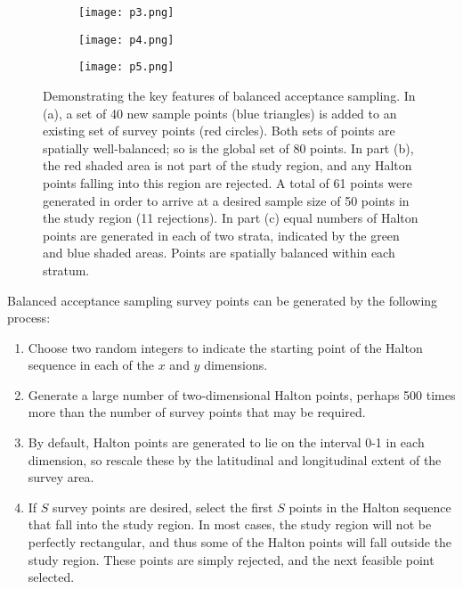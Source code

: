 \documentclass[a4paper,11pt, draft]{article} %
\begin{document}
\begin{figure}[htbp]
\centering
  \begin{subfigure}[b]{0.3\textwidth}
    \texttt{[image: p3.png]}
    \caption{}
  \end{subfigure}
  \begin{subfigure}[b]{0.3\textwidth}
    \texttt{[image: p4.png]}
    \caption{}
  \end{subfigure}
  \begin{subfigure}[b]{0.3\textwidth}
    \texttt{[image: p5.png]}
    \caption{}
  \end{subfigure}
  \caption{Demonstrating the key features of balanced acceptance sampling. In (a), a set of 40 new sample points (blue triangles) is added to an existing set of survey points (red circles). Both sets of points are spatially well-balanced; so is the global set of 80 points. In part (b), the red shaded area is not part of the study region, and any Halton points falling into this region are rejected. A total of 61 points were generated in order to arrive at a desired sample size of 50 points in the study region (11 rejections). In part (c) equal numbers of Halton points are generated in each of two strata, indicated by the green and blue shaded areas. Points are spatially balanced within each stratum.}
  \label{h345}
\end{figure}

Balanced acceptance sampling survey points can be generated by the following process:
\begin{enumerate}
\item Choose two random integers to indicate the starting point of the Halton sequence in each of the $x$ and $y$ dimensions.
\item Generate a large number of two-dimensional Halton points, perhaps 500 times more than the number of survey points that may be required.
\item By default, Halton points are generated to lie on the interval 0-1 in each dimension, so rescale these by the latitudinal and longitudinal extent of the survey area. 
\item If $S$ survey points are desired, select the first $S$ points in the Halton sequence that fall into the study region. In most cases, the study region will not be perfectly rectangular, and thus some of the Halton points will fall outside the study region. These points are simply rejected, and the next feasible point selected.
\end{enumerate}
\end{document}
